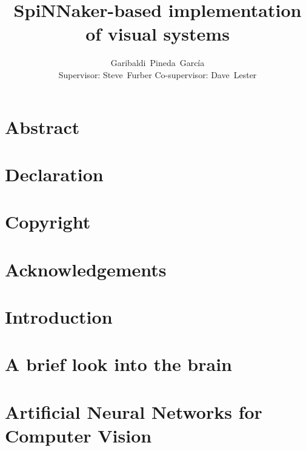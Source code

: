 \documentclass[11pt,a4paper]{memoir}
\title{SpiNNaker-based implementation of visual systems}
\author{Garibaldi~Pineda~García \\ Supervisor: Steve~Furber Co-supervisor: Dave~Lester}
\date{}
\begin{document}
  \thispagestyle{empty}
  

  \cleardoublepage
    \thispagestyle{empty}
  \tableofcontents
  \listoffigures
  \listoftables


\chapter*{Abstract}
\label{abstract}


\chapter*{Declaration}
\label{declaration}


\chapter*{Copyright}
\label{copyright}


\chapter*{Acknowledgements}
\label{acknowledgements}


\clearpage
{}
\pagestyle{ruled}

  \chapter{Introduction}
  
  \label{chp:intro}

  \chapter{A brief look into the brain}
  \label{chp:brain}
  

  \chapter{Artificial Neural Networks for Computer Vision}
  \label{chp:vision}
  
\end{document}
